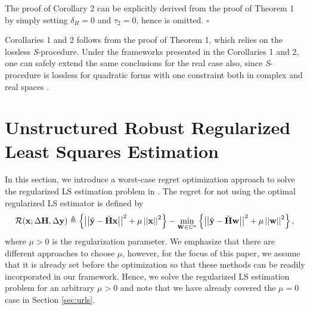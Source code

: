 \documentclass[review,sort&compress]{elsarticle}
\renewcommand{\vec}[1]{\mbox{$\mathbf{#1}$}}
\newcommand{\norm}[1]{\left|\left|#1\right|\right|}
\newcommand{\defi}{\triangleq}
\newcommand{\C}{\mathbb{C}}
\newcommand{\R}{{\cal R}}
\newcommand{\vH}{\vec{H}}
\newcommand{\vx}{\vec{x}}
\newcommand{\vy}{\vec{y}}
\newcommand{\dH}{\Delta\vH}
\newcommand{\dy}{\Delta\vy}
\newcommand{\tH}{\tilde{\vec{H}}}
\newcommand{\ty}{\tilde{\vec{y}}}
\newcommand{\vw}{\vec{w}}
\begin{document}
\begin{poc2}
The proof of Corollary 2 can be explicitly derived from the proof of Theorem 1 by simply setting $\delta_H = 0$ and $\tau_2 = 0$, hence is omitted. \hfill $\square$
\end{poc2}

\begin{rmk}
Corollaries 1 and 2 follows from the proof of Theorem 1, which relies on the lossless {\em S}-procedure. Under the frameworks presented in the Corollaries 1 and 2, one can safely extend the same conclusions for the real case also, since {\em S}-procedure is lossless for quadratic forms with one constraint both in complex and real spaces \cite{huang1,huang2}.
\end{rmk}

\section{Unstructured Robust Regularized Least Squares Estimation} \label{sec:urrls}
In this section, we introduce a worst-case regret optimization approach to solve the regularized LS estimation problem in \cite{est2}. The regret for not using the optimal regularized LS estimator is defined by
\begin{equation}\label{Req:LSreg0}
  \R(\vx;\dH,\dy) \defi \left\{ {\norm{\ty - \tH \vx}}^2 + \mu \norm{\vx}^2 \right\}-  \min_{\vw \in \C^n} \left\{ \norm{\ty - \tH \vw}^2 + \mu \norm{\vw}^2 \right\},
\end{equation}
where $\mu > 0$ is the regularization parameter. We emphasize that there are different approaches to choose $\mu$, however, for the focus of this paper, we assume that it is already set before the optimization so that these methods can be readily incorporated in our framework. Hence, we solve the regularized LS estimation problem for an arbitrary $\mu > 0$ and note that we have already covered the $\mu = 0$ case in Section \ref{sec:urls}.
\end{document}
